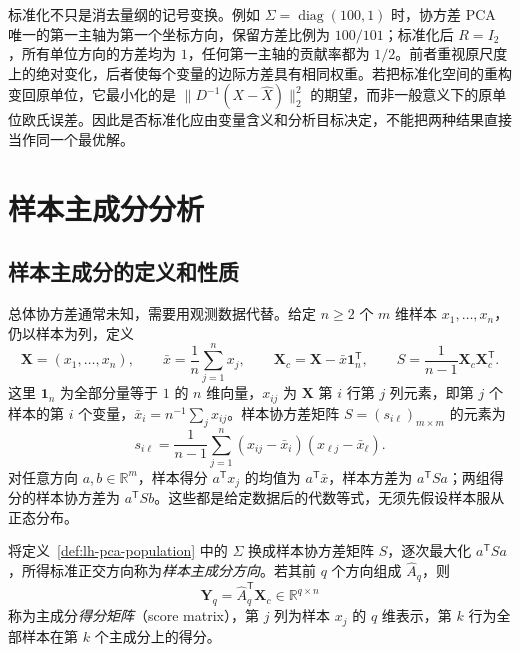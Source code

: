 标准化不只是消去量纲的记号变换。例如 $\Sigma=\operatorname{diag}(100,1)$ 时，协方差 PCA 唯一的第一主轴为第一个坐标方向，保留方差比例为 $100/101$；标准化后 $R=I_2$，所有单位方向的方差均为 $1$，任何第一主轴的贡献率都为 $1/2$。前者重视原尺度上的绝对变化，后者使每个变量的边际方差具有相同权重。若把标准化空间的重构变回原单位，它最小化的是 $\|D^{-1}(X-\widehat X)\|_2^2$ 的期望，而非一般意义下的原单位欧氏误差。因此是否标准化应由变量含义和分析目标决定，不能把两种结果直接当作同一个最优解。

\section{样本主成分分析}
\label{sec:lh-pca-sample}

\subsection{样本主成分的定义和性质}
\label{subsec:lh-pca-sample-definition}

总体协方差通常未知，需要用观测数据代替。给定 $n\geq2$ 个 $m$ 维样本 $x_1,\ldots,x_n$，仍以样本为列，定义
\begin{equation}
\mathbf X=(x_1,\ldots,x_n),\qquad
\bar x=\frac1n\sum_{j=1}^n x_j,\qquad
\mathbf X_c=\mathbf X-\bar x\mathbf 1_n^{\mathsf T},\qquad
S=\frac1{n-1}\mathbf X_c\mathbf X_c^{\mathsf T}.
\label{eq:lh-pca-sample-cov}
\end{equation}
这里 $\mathbf 1_n$ 为全部分量等于 $1$ 的 $n$ 维向量，$x_{ij}$ 为 $\mathbf X$ 第 $i$ 行第 $j$ 列元素，即第 $j$ 个样本的第 $i$ 个变量，$\bar x_i=n^{-1}\sum_jx_{ij}$。样本协方差矩阵 $S=(s_{i\ell})_{m\times m}$ 的元素为
\[
s_{i\ell}=\frac1{n-1}\sum_{j=1}^n(x_{ij}-\bar x_i)(x_{\ell j}-\bar x_\ell).
\]
对任意方向 $a,b\in\mathbb R^m$，样本得分 $a^{\mathsf T}x_j$ 的均值为 $a^{\mathsf T}\bar x$，样本方差为 $a^{\mathsf T}Sa$；两组得分的样本协方差为 $a^{\mathsf T}Sb$。这些都是给定数据后的代数等式，无须先假设样本服从正态分布。

\begin{definition}[样本主成分]
\label{def:lh-pca-sample}
将定义~\ref{def:lh-pca-population} 中的 $\Sigma$ 换成样本协方差矩阵 $S$，逐次最大化 $a^{\mathsf T}Sa$，所得标准正交方向称为\emph{样本主成分方向}。若其前 $q$ 个方向组成 $\widehat A_q$，则
\begin{equation}
\mathbf Y_q=\widehat A_q^{\mathsf T}\mathbf X_c\in\mathbb R^{q\times n}
\label{eq:lh-pca-sample-scores}
\end{equation}
称为主成分\emph{得分矩阵}（score matrix），第 $j$ 列为样本 $x_j$ 的 $q$ 维表示，第 $k$ 行为全部样本在第 $k$ 个主成分上的得分。
\end{definition}

